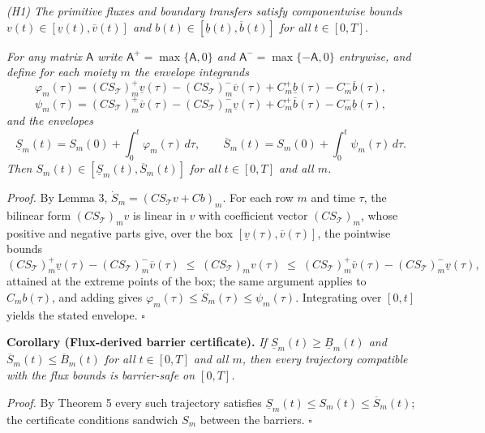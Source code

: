 \documentclass[11pt]{article}
\begin{document}
\emph{(H1) The primitive fluxes and boundary transfers satisfy
componentwise bounds \(v(t) \in [\underline{v}(t), \overline{v}(t)]\)
and \(b(t) \in [\underline{b}(t), \overline{b}(t)]\) for all
\(t \in [0,T]\).}

\emph{For any matrix \(\mathsf{A}\) write
\(\mathsf{A}^{+} = \max\{\mathsf{A}, 0\}\) and
\(\mathsf{A}^{-} = \max\{-\mathsf{A}, 0\}\) entrywise, and define for
each moiety \(m\) the envelope integrands}
\[\varphi_m(\tau) = (C S_{\mathcal{T}})_{m}^{+} \underline{v}(\tau) - (C S_{\mathcal{T}})_{m}^{-} \overline{v}(\tau) + C_{m}^{+} \underline{b}(\tau) - C_{m}^{-} \overline{b}(\tau),\]
\[\psi_m(\tau) = (C S_{\mathcal{T}})_{m}^{+} \overline{v}(\tau) - (C S_{\mathcal{T}})_{m}^{-} \underline{v}(\tau) + C_{m}^{+} \overline{b}(\tau) - C_{m}^{-} \underline{b}(\tau),\]
\emph{and the envelopes}
\[\underline{S}_m(t) = S_m(0) + \int_0^t \varphi_m(\tau)\, d\tau, \qquad \overline{S}_m(t) = S_m(0) + \int_0^t \psi_m(\tau)\, d\tau.\]
\emph{Then \(S_m(t) \in [\underline{S}_m(t), \overline{S}_m(t)]\) for
all \(t \in [0,T]\) and all \(m\).}

\emph{Proof.} By Lemma 3, \(\dot S_m = (C S_{\mathcal{T}} v + Cb)_m\).
For each row \(m\) and time \(\tau\), the bilinear form
\((C S_{\mathcal{T}})_m v\) is linear in \(v\) with coefficient vector
\((C S_{\mathcal{T}})_m\), whose positive and negative parts give, over
the box \([\underline{v}(\tau), \overline{v}(\tau)]\), the pointwise
bounds
\[(C S_{\mathcal{T}})_{m}^{+} \underline{v}(\tau) - (C S_{\mathcal{T}})_{m}^{-} \overline{v}(\tau) \;\le\; (C S_{\mathcal{T}})_m v(\tau) \;\le\; (C S_{\mathcal{T}})_{m}^{+} \overline{v}(\tau) - (C S_{\mathcal{T}})_{m}^{-} \underline{v}(\tau),\]
attained at the extreme points of the box; the same argument applies to
\(C_m b(\tau)\), and adding gives
\(\varphi_m(\tau) \le \dot S_m(\tau) \le \psi_m(\tau)\). Integrating
over \([0,t]\) yields the stated envelope. \ensuremath{\square}

\textbf{Corollary (Flux-derived barrier certificate).} \emph{If
\(\underline{S}_m(t) \ge \underline{B}_m(t)\) and
\(\overline{S}_m(t) \le \overline{B}_m(t)\) for all \(t \in [0,T]\) and
all \(m\), then every trajectory compatible with the flux bounds is
barrier-safe on \([0,T]\).}

\emph{Proof.} By Theorem 5 every such trajectory satisfies
\(\underline{S}_m(t) \le S_m(t) \le \overline{S}_m(t)\); the certificate
conditions sandwich \(S_m\) between the barriers. \ensuremath{\square}
\end{document}
